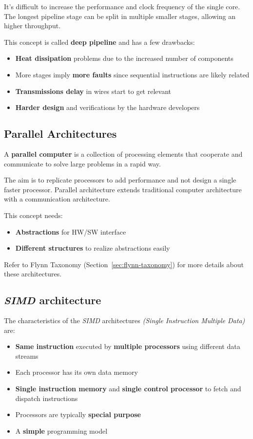 \documentclass[english]{article}
\begin{document}
It's difficult to increase the performance and clock frequency of the single core.
The longest pipeline stage can be split in multiple smaller stages, allowing an higher throughput.

This concept is called \textbf{deep pipeline} and has a few drawbacks:

\begin{itemize}
  \item \textbf{Heat dissipation} problems due to the increased number of components
  \item More stages imply \textbf{more faults} since sequential instructions are likely related
  \item \textbf{Transmissions delay} in wires start to get relevant
  \item \textbf{Harder design} and verifications by the hardware developers
\end{itemize}

\subsection{Parallel Architectures}

A \textbf{parallel computer} is a collection of processing elements that cooperate and communicate to solve large problems in a rapid way.

The aim is to replicate processors to add performance and not design a single faster processor.
Parallel architecture extends traditional computer architecture with a communication architecture.

This concept needs:

\begin{itemize}
  \item \textbf{Abstractions} for HW/SW interface
  \item \textbf{Different structures} to realize abstractions easily
\end{itemize}

Refer to Flynn Taxonomy (Section~\ref{sec:flynn-taxonomy}) for more details about these architectures.

\subsection{\textit{SIMD} architecture}

The characteristics of the \textit{SIMD} architectures \textit{(Single Instruction Multiple Data)} are:

\begin{itemize}
  \item \textbf{Same instruction} executed by \textbf{multiple processors} using different data streams
  \item Each processor has its own data memory
  \item \textbf{Single instruction memory} and \textbf{single control processor} to fetch and dispatch instructions
  \item Processors are typically \textbf{special purpose}
  \item A \textbf{simple} programming model
\end{itemize}
\end{document}

